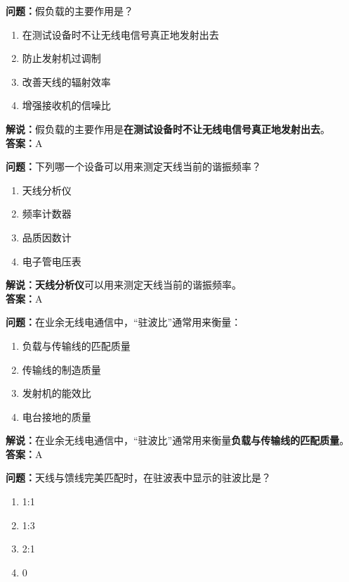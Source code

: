 \textbf{问题：}假负载的主要作用是？

\begin{enumerate}[label=\Alph*), leftmargin=1cm]
	\item 在测试设备时不让无线电信号真正地发射出去
	\item 防止发射机过调制
	\item 改善天线的辐射效率
	\item 增强接收机的信噪比
\end{enumerate}

\textbf{解说：}假负载的主要作用是\textbf{在测试设备时不让无线电信号真正地发射出去}。\\\textbf{答案：}A



\textbf{问题：}下列哪一个设备可以用来测定天线当前的谐振频率？

\begin{enumerate}[label=\Alph*), leftmargin=1cm]
	\item 天线分析仪
	\item 频率计数器
	\item 品质因数计
	\item 电子管电压表
\end{enumerate}

\textbf{解说：}\textbf{天线分析仪}可以用来测定天线当前的谐振频率。\\\textbf{答案：}A



\textbf{问题：}在业余无线电通信中，“驻波比”通常用来衡量：

\begin{enumerate}[label=\Alph*), leftmargin=1cm]
	\item 负载与传输线的匹配质量
	\item 传输线的制造质量
	\item 发射机的能效比
	\item 电台接地的质量
\end{enumerate}

\textbf{解说：}在业余无线电通信中，“驻波比”通常用来衡量\textbf{负载与传输线的匹配质量}。\\\textbf{答案：}A



\textbf{问题：}天线与馈线完美匹配时，在驻波表中显示的驻波比是？

\begin{enumerate}[label=\Alph*), leftmargin=1cm]
	\item 1:1
	\item 1:3
	\item 2:1
	\item 0
\end{enumerate}

